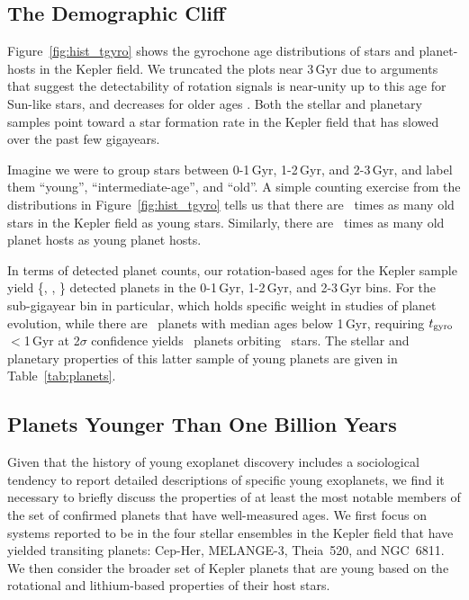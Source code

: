 \documentclass[11pt,twocolumn,tighten]{aastex63}
\begin{document}
\subsection{The Demographic Cliff}

Figure~\ref{fig:hist_tgyro} shows the gyrochone age distributions of
stars and planet-hosts in the Kepler field.  We truncated the plots
near $3$\,Gyr due to arguments that suggest the detectability of
rotation signals is near-unity up to this age for Sun-like stars, and
decreases for older ages \citep{2022ApJ...937...94M}.  Both the
stellar and planetary samples point toward a star formation rate in
the Kepler field that has slowed over the past few gigayears.

Imagine we were to group stars between 0-1\,Gyr, 1-2\,Gyr, and
2-3\,Gyr, and label them ``young'', ``intermediate-age'', and ``old''.
A simple counting exercise from the distributions in
Figure~\ref{fig:hist_tgyro} tells us that there are \ratioobtoybstars\
times as many old stars in the Kepler field as young stars.
Similarly, there are \ratioobtoybplanets\ times as many old planet
hosts as young planet hosts. 

In terms of detected planet counts, our rotation-based ages for the
Kepler sample yield \{\nplyounggyro, \nplmidgyro, \nploldgyro\}
detected planets in the 0-1\,Gyr, 1-2\,Gyr, and 2-3\,Gyr bins.  For
the sub-gigayear bin in particular, which holds specific weight in
studies of planet evolution, while there are \nplyounggyro\ planets
with median ages below 1\,Gyr, requiring $t_{\rm gyro}$$<$1\,Gyr at
2$\sigma$ confidence yields \nplyounggyrotwosigma\ planets orbiting
\nplhostsyounggyrotwosigma\ stars.  The stellar and planetary
properties of this latter sample of young planets are given in
Table~\ref{tab:planets}.


\subsection{Planets Younger Than One Billion Years}

Given that the history of young exoplanet discovery includes a
sociological tendency to report detailed descriptions of specific
young exoplanets, we find it necessary to briefly discuss the
properties of at least the most notable members of the set of
confirmed planets that have well-measured ages.  We first focus on
systems reported to be in the four stellar ensembles in the Kepler
field that have yielded transiting planets: Cep-Her, MELANGE-3,
Theia~520, and NGC~6811.  We then consider the broader set of Kepler
planets that are young based on the rotational and lithium-based
properties of their host stars.
\end{document}
